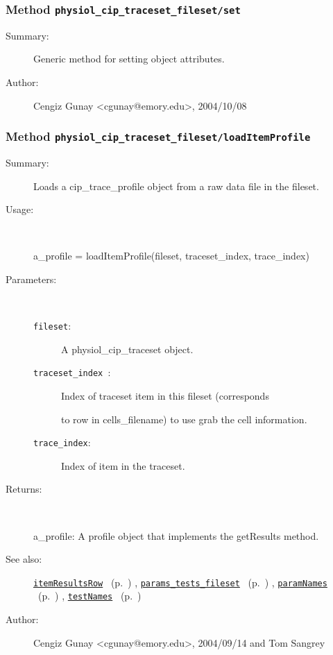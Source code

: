 \subsubsection[Method \texttt{set}]{Method \texttt{physiol\_cip\_traceset\_fileset/set}}%
%
\label{ref_physiol_cip_traceset_fileset__set}%
\hypertarget{ref_physiol_cip_traceset_fileset__set}{}%
\begin{description}
\item[Summary:]Generic method for setting object attributes.
%
%
%
%
%
%
%
\item[Author:]%
Cengiz Gunay <cgunay@emory.edu>, 2004/10/08%
\end{description}
\methodline%
\subsubsection[Method \texttt{loadItemProfile}]{Method \texttt{physiol\_cip\_traceset\_fileset/loadItemProfile}}%
%
\label{ref_physiol_cip_traceset_fileset__loadItemProfile}%
\hypertarget{ref_physiol_cip_traceset_fileset__loadItemProfile}{}%
\begin{description}
\item[Summary:]Loads a cip\_trace\_profile object from a raw data file in the fileset.
%
\item[Usage:]~%
\begin{lyxcode}%
a\_profile = loadItemProfile(fileset, traceset\_index, trace\_index)
%
\end{lyxcode}%
%
%
\item[Parameters:]~
\begin{description}%
\item[\texttt{fileset}:]
     A physiol\_cip\_traceset object.
\item[\texttt{traceset\_index }:]
  Index of traceset item in this fileset (corresponds 

to row in cells\_filename) to use grab the cell information.\item[\texttt{trace\_index}:]
 Index of item in the traceset.
\end{description}%
%
\item[Returns:]~

	a\_profile: A profile object that implements the getResults method.
%
%
\item[See also:]%
\hyperlink{ref_itemResultsRow}{\texttt{itemResultsRow}}%
\ (p.~\pageref{ref_itemResultsRow})%
%
, \hyperlink{ref_params_tests_fileset}{\texttt{params\_tests\_fileset}}%
\ (p.~\pageref{ref_params_tests_fileset})%
%
, \hyperlink{ref_paramNames}{\texttt{paramNames}}%
\ (p.~\pageref{ref_paramNames})%
%
, \hyperlink{ref_testNames}{\texttt{testNames}}%
\ (p.~\pageref{ref_testNames})%
%
%
\item[Author:]%
Cengiz Gunay <cgunay@emory.edu>, 2004/09/14 and Tom Sangrey%
\end{description}
\methodline%
